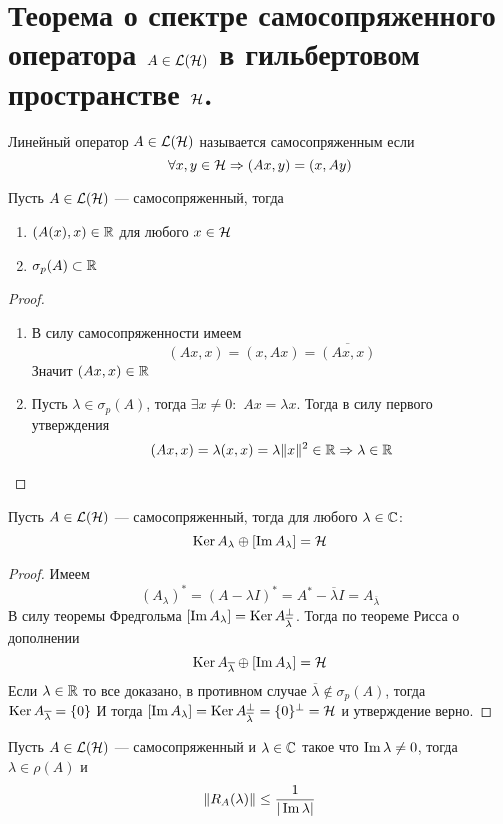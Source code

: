 \newpage
\section{Теорема о спектре самосопряженного оператора $A \in \mathcal{L}(\mathcal{H})$ в гильбертовом пространстве $\mathcal{H}$.}
\begin{definition}
	Линейный оператор $A \in \mathcal{L}(\mathcal{H})$ называется самосопряженным если 
	$$
	\forall x,y \in \mathcal{H} \Rightarrow (Ax, y) = (x, Ay)
	$$
\end{definition}
\begin{claim}
	Пусть $A \in \mathcal{L}(\mathcal{H})$ --- самосопряженный, тогда 
	\begin{enumerate}
		\item $(A(x), x)  \in \mathbb{R}$ для любого $x \in \mathcal{H}$ 
		\item $\sigma_p(A) \subset \mathbb{R}$
	\end{enumerate}
\end{claim}
\begin{proof}
	\begin{enumerate}
		\item В силу самосопряженности имеем 
		$$
		(Ax,x) = (x,Ax) = \overline{(Ax,x)}
		$$
		Значит $(Ax,x) \in \mathbb{R}$
		\item Пусть $\lambda \in \sigma_p(A)$, тогда $\exists x \neq 0:$ $Ax = \lambda x$. Тогда в силу первого утверждения 
		$$
		(Ax,x) = \lambda(x,x) = \lambda \|x\|^2 \in \mathbb{R} \Rightarrow \lambda \in \mathbb{R}
		$$
	\end{enumerate}
\end{proof}
\begin{claim}
	Пусть $A \in \mathcal{L}(\mathcal{H})$ --- самосопряженный, тогда для любого $\lambda \in \mathbb{C}$:
	$$
	\operatorname{Ker} A_\lambda \oplus [\operatorname{Im} A_\lambda] = \mathcal{H}
	$$
\end{claim}
\begin{proof}
	Имеем 
	$$
	(A_\lambda)^* = (A - \lambda I)^* =  A^* - \overline{\lambda}I = A_{\overline{\lambda}}
	$$
	В силу теоремы Фредгольма $[\operatorname{Im} A_\lambda] = \operatorname{Ker} A_{\overline{\lambda}}^\perp$. Тогда по теореме Рисса о дополнении
	$$
	\operatorname{Ker} A_{\overline{\lambda}} \oplus [\operatorname{Im} A_\lambda] = \mathcal{H}
	$$
	Если $\lambda \in \mathbb{R}$ то все доказано, в противном случае $\overline{\lambda }\notin \sigma_p(A)$, тогда $\operatorname{Ker} A_{\overline{\lambda}} = \{0\}$ И тогда $[\operatorname{Im} A_\lambda] = \operatorname{Ker} A_{\overline{\lambda}}^\perp = \{0\}^\perp = \mathcal{H}$ и утверждение верно. 
\end{proof}
\begin{claim}
	 Пусть $A \in \mathcal{L}(\mathcal{H})$ --- самосопряженный и $\lambda \in \mathbb{C}$ такое что $\operatorname{Im} \lambda \neq 0$, тогда $\lambda \in \rho(A)$ и 
	 $$
	 \|R_A(\lambda)\| \leq \frac{1}{|\operatorname{Im} \lambda|}
	 $$
\end{claim}
